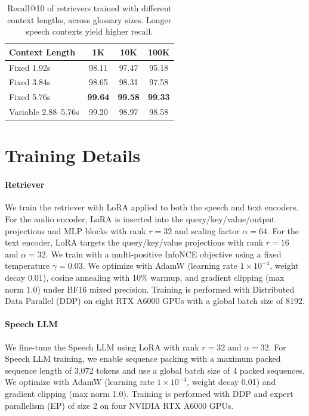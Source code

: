 \begin{table}[t]
\centering
\setlength{\tabcolsep}{4pt}
\begin{tabular}{lccc}
\toprule
Context Length & 1K & 10K & 100K \\
\midrule
Fixed 1.92s & 98.11 & 97.47 & 95.18 \\
Fixed 3.84s & 98.65 & 98.31 & 97.58 \\
Fixed 5.76s & \textbf{99.64} & \textbf{99.58} & \textbf{99.33} \\
Variable 2.88--5.76s & 99.20 & 98.97 & 98.58 \\
\bottomrule
\end{tabular}
\caption{Recall@10 of retrievers trained with different context lengths, across glossary sizes. Longer speech contexts yield higher recall.}
\label{tab:ablation_context}
\end{table}



\section{Training Details}\label{app:training_details}

\paragraph{Retriever}
We train the retriever with LoRA applied to both the speech and text encoders.
For the audio encoder, LoRA is inserted into the query/key/value/output projections and MLP blocks with rank $r{=}32$ and scaling factor $\alpha{=}64$.
For the text encoder, LoRA targets the query/key/value projections with rank $r{=}16$ and $\alpha{=}32$.
We train with a multi-positive InfoNCE objective using a fixed temperature $\gamma{=}0.03$.
We optimize with AdamW (learning rate $1\times10^{-4}$, weight decay 0.01), cosine annealing with 10\% warmup, and gradient clipping (max norm 1.0) under BF16 mixed precision.
Training is performed with Distributed Data Parallel (DDP) on eight RTX A6000 GPUs with a global batch size of 8192.

\paragraph{Speech LLM}
We fine-tune the Speech LLM using LoRA with rank $r{=}32$ and $\alpha{=}32$.
For Speech LLM training, we enable sequence packing with a maximum packed sequence length of 3,072 tokens and use a global batch size of 4 packed sequences.
We optimize with AdamW (learning rate $1\times10^{-4}$, weight decay 0.01) and gradient clipping (max norm 1.0).
Training is performed with DDP and expert parallelism (EP) of size 2 on four NVIDIA RTX A6000 GPUs.

